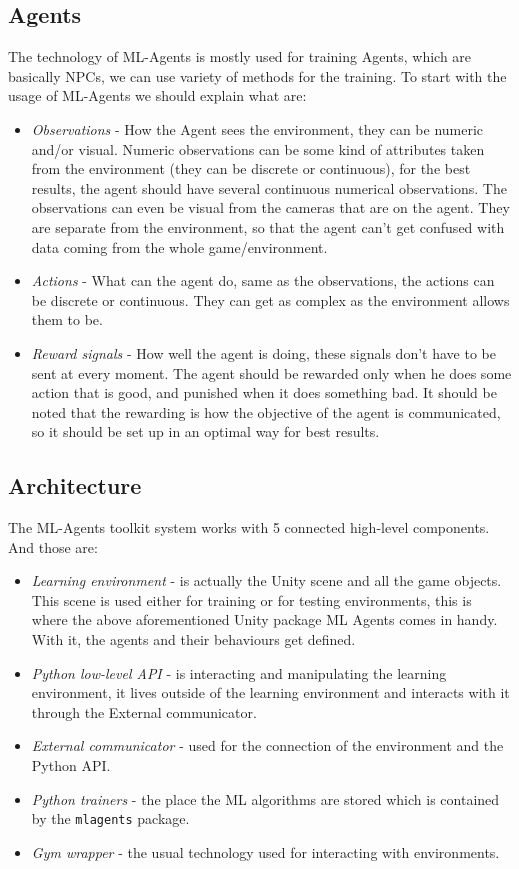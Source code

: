 \documentclass[a4paper, 12pt]{book}
\begin{document}
\subsection{Agents}

The technology of ML-Agents is mostly used for training Agents, which are basically NPCs, we can use variety of methods for the training. To start with the usage of ML-Agents we should explain what are:

\begin{itemize}
    \item \emph{Observations} - How the Agent sees the environment, they can be numeric and/or visual. Numeric observations can be some kind of attributes taken from the environment (they can be discrete or continuous), for the best results, the agent should have several continuous numerical observations. The observations can even be visual from the cameras that are on the agent. They are separate from the environment, so that the agent can't get confused with data coming from the whole game/environment.
    \item \emph{Actions} - What can the agent do, same as the observations, the actions can be discrete or continuous. They can get as complex as the environment allows them to be.
    \item \emph{Reward signals} - How well the agent is doing, these signals don't have to be sent at every moment. The agent should be rewarded only when he does some action that is good, and punished when it does something bad. It should be noted that the rewarding is how the objective of the agent is communicated, so it should be set up in an optimal way for best results.
\end{itemize}

\subsection{Architecture}

The ML-Agents toolkit system works with 5 connected high-level components. And those are:

\begin{itemize}
    \item \emph{Learning environment} - is actually the Unity scene and all the game objects. This scene is used either for training or for testing environments, this is where the above aforementioned Unity package ML Agents comes in handy. With it, the agents and their behaviours get defined.
    \item \emph{Python low-level API} - is interacting and manipulating the learning environment, it lives outside of the learning environment and interacts with it through the External communicator.
    \item \emph{External communicator} - used for the connection of the environment and the Python API.
    \item \emph{Python trainers} - the place the ML algorithms are stored which is contained by the \texttt{mlagents} package.
    \item \emph{Gym wrapper} \cite{openAIGym} - the usual technology used for interacting with environments.
\end{itemize}
\end{document}
